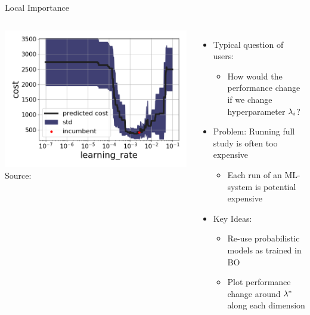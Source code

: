 \begin{frame}[c]{Local Importance }

\begin{columns}
	
	\begin{center}
		\includegraphics[width=1.0\textwidth]{images/learning_rate_lpi.png}\\
		Source: 
	\end{center}
	
	
	\begin{itemize}
		\item Typical question of users:
		\begin{itemize}
			\item How would the performance change\\
			if we change hyperparameter $\mathbf{\lambda}_i$?
		\end{itemize}
		\item Problem: Running full study is often too expensive
		\begin{itemize}
			\item Each run of an ML-system is potential expensive
		\end{itemize}
		\item \alert{Key Ideas:}
		\begin{itemize}
			\item Re-use probabilistic models as trained in BO
			\item Plot performance change around $\mathbf{\lambda}^*$\\
			 along each dimension
		\end{itemize} 
	\end{itemize}
	
\end{columns}

\end{frame}
